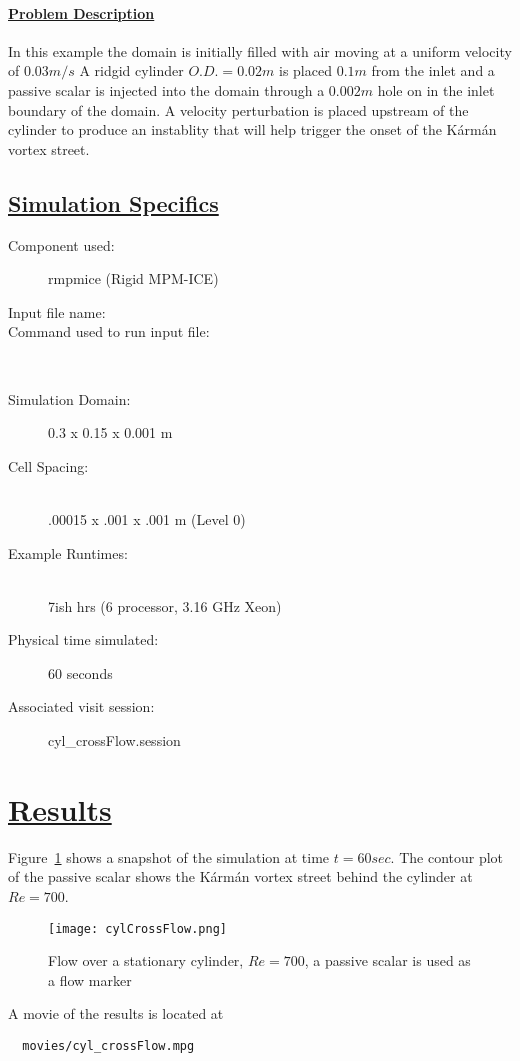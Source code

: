 \paragraph*{\underline{Problem Description}}
In this example the domain is initially filled with air moving at a uniform velocity of $0.03m/s$  A ridgid cylinder $O.D. = 0.02m$ is placed $0.1m$ from the inlet and a passive scalar is injected into the domain through a $0.002m$ hole on in the inlet boundary of the domain.  A velocity perturbation is placed upstream of the cylinder to produce an instablity that will help trigger the onset of the K\'arm\'an vortex street.
%
\subsection*{\underline{Simulation Specifics}}
\begin{description}
\item [Component used:] \hfill rmpmice (Rigid MPM-ICE)
\item [Input file name:] \hfill {}
\item [Command used to run input file:]\hfill \\

\item [Simulation Domain:]\hfill    0.3 x 0.15 x 0.001 m

\item [Cell Spacing:]\hfill \\
.00015 x .001 x .001 m (Level 0)

\item [Example Runtimes:] \hfill \\
 7ish hrs   (6 processor, 3.16 GHz Xeon)\\

\item [Physical time simulated:] \hfill 60 seconds

\item [Associated visit session:] \hfill cyl\_crossFlow.session

\end{description}

\section*{\underline{Results}}

Figure~\ref{fig:cylCrossFlow} shows a snapshot of the simulation at time $t=60sec$.  The contour
plot of the passive scalar shows the K\'arm\'an vortex street behind the cylinder at $Re=700$.
\begin{figure}
  \center
  \texttt{[image: cylCrossFlow.png]}
  \caption{Flow over a stationary cylinder, $Re=700$, a passive scalar is used as a flow marker}
  \label{fig:cylCrossFlow}
\end{figure}
%
A movie of the results is located at
\begin{lstlisting}
  movies/cyl_crossFlow.mpg
\end{lstlisting}
\newpage

